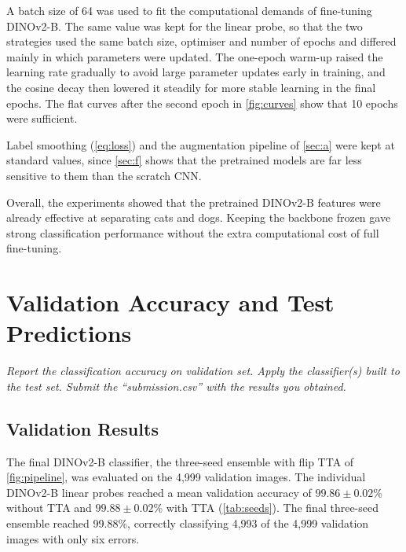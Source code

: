 \documentclass[11pt,a4paper]{article}
\newenvironment{question}
  {\par\smallskip\noindent\begin{lrbox}{\questionbox}%
   \begin{minipage}{\dimexpr\linewidth-2\fboxsep-2\fboxrule\relax}\small\itshape}
  {\end{minipage}\end{lrbox}%
   \fcolorbox{gray!45}{gray!7}{\usebox{\questionbox}}\par\smallskip}
\newcommand{\pct}[1]{#1\%}
\newcommand{\pmpct}[2]{$#1 \pm #2$\%}
\begin{document}
A batch size of 64 was used to fit the computational demands of fine-tuning DINOv2-B. The same value was kept for the linear probe, so that the two strategies used the same batch size, optimiser and number of epochs and differed mainly in which parameters were updated. The one-epoch warm-up raised the learning rate gradually to avoid large parameter updates early in training, and the cosine decay then lowered it steadily for more stable learning in the final epochs. The flat curves after the second epoch in \cref{fig:curves} show that 10 epochs were sufficient.

Label smoothing (\cref{eq:loss}) and the augmentation pipeline of \cref{sec:a} were kept at standard values, since \cref{sec:f} shows that the pretrained models are far less sensitive to them than the scratch CNN.

Overall, the experiments showed that the pretrained DINOv2-B features were already effective at separating cats and dogs. Keeping the backbone frozen gave strong classification performance without the extra computational cost of full fine-tuning.

\section{Validation Accuracy and Test Predictions}\label{sec:d}

\begin{question}
Report the classification accuracy on validation set. Apply the classifier(s) built to the test set. Submit the ``submission.csv'' with the results you obtained.
\end{question}

\subsection*{Validation Results}

The final DINOv2-B classifier, the three-seed ensemble with flip TTA of \cref{fig:pipeline}, was evaluated on the 4,999 validation images. The individual DINOv2-B linear probes reached a mean validation accuracy of \pmpct{99.86}{0.02} without TTA and \pmpct{99.88}{0.02} with TTA (\cref{tab:seeds}). The final three-seed ensemble reached \pct{99.88}, correctly classifying 4,993 of the 4,999 validation images with only six errors.
\end{document}
